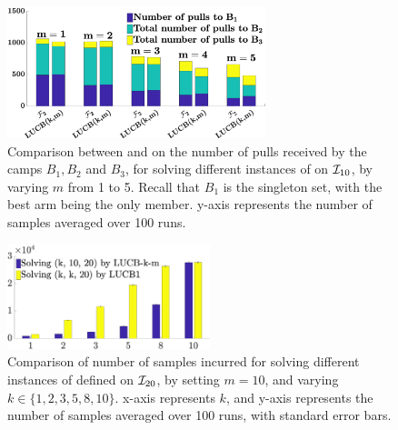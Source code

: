 \begin{figure}[h]
\centering
 \includegraphics[height=1.5in]{frac_opt_pull_short.eps}
 \caption{Comparison between \FF and \GLUCB on the number of
	  pulls received by the camps $B_1, B_2$ and $B_3$, for solving
	  different instances of \QF on $\mathcal{I}_{10}$, by varying $m$ from 1 to 5. 
	  Recall that $B_1$ is the singleton set, with the best arm being 
	  the only member. y-axis represents the number of samples averaged over 100 runs.}
 \label{fig:fracoptpull}
\end{figure}

\begin{figure}[h]
\centering
 \includegraphics[height=1.2in]{comp_glucb_var_k.eps}
 \caption{ Comparison of number of samples incurred for 
	  solving different  instances of \QFK defined on $\mathcal{I}_{20}$, by 
	  setting $m = 10$, and varying $k \in \{1, 2, 3, 5, 8, 10\}$.
	  x-axis represents $k$, and y-axis represents the number of samples 
	  averaged over 100 runs, with standard error bars.}
 \label{fig:vark_fixtopm}
\end{figure}
